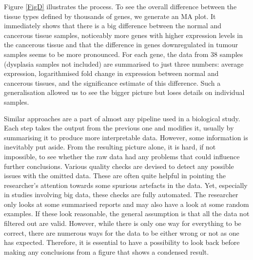\documentclass[twocolumn,10pt]{article}
\begin{document}
Figure \ref{FigD} illustrates the process. To see the overall difference between the tissue types defined by thousands of genes, we generate an MA plot. It immediately shows that there is a big difference between the normal and cancerous tissue samples, noticeably more genes with higher expression levels in the cancerous tissue and that the difference in genes downregulated in tumour samples seems to be more pronounced. For each gene, the data from 38 samples (dysplasia samples not included) are summarised to just three numbers: average expression, logarithmised fold change in expression between normal and cancerous tissues, and the significance estimate of this difference. Such a generalisation allowed us to see the bigger picture but loses details on individual samples.

Similar approaches are a part of almost any pipeline used in a biological study. Each step takes the output from the previous one and modifies it, usually by summarising it to produce more interpretable data. However, some information is inevitably put aside. From the resulting picture alone, it is hard, if not impossible, to see whether the raw data had any problems that could influence further conclusions. Various quality checks are devised to detect any possible issues with the omitted data. These are often quite helpful in pointing the researcher's attention towards some spurious artefacts in the data. Yet, especially in studies involving big data, these checks are fully automated. The researcher only looks at some summarised reports and may also have a look at some random examples. If these look reasonable, the general assumption is that all the data not filtered out are valid. However, while there is only one way for everything to be correct, there are numerous ways for the data to be either wrong or not as one has expected. Therefore, it is essential to have a possibility to look back before making any conclusions from a figure that shows a condensed result.
\end{document}

